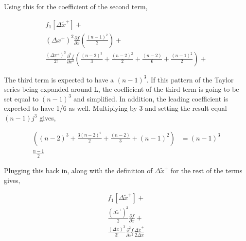 \documentclass[12pt]{article}
\begin{document}
Using this for the coefficient of the second term,

\begin{align*}
     f_1\left[ \Delta \widetilde{x}^+  \right] + \\
    (\Delta x^+)^2 \frac{\partial f}{\partial x } \left(
    \frac{(n-1)^2}{2}  \right) + \\
        \frac{(\Delta x^+)^3}{2!} \frac{\partial^2 f}{\partial x^2 } \left(
        \frac{(n-2)^3}{3} + \frac{(n-2)^2}{2} + \frac{(n-2)}{6} + \frac{(n-1)^2}{2} \right)  +
\end{align*}

The third term is expected to have a $\left( n-1 \right)^3$. If this pattern
of the Taylor series being expanded around L, the coefficient of the third term
is going to be set equal to $\left( n-1 \right)^3$ and simplified. In addition,
the leading coefficient is expected to have 1/6 as well. Multiplying by 3
and setting the result equal $(n-1)j^3$ gives,

\begin{align*}
    \left(
    (n-2)^3 + \frac{3(n-2)^2}{2} + \frac{(n-2)}{3} + (n-1)^2 
    \right)
    &=
    (n-1)^3 \\
    \frac{n-1}{2}
\end{align*}

Plugging this back in, along with the definition of $\Delta \widetilde{x}^+$ for
the rest of the terms gives,

\begin{align*}
     f_1\left[ \Delta \widetilde{x}^+  \right] + \\
 \frac{(\Delta \widetilde{x}^+)^2}{2}     \frac{\partial f}{\partial x }  + \\
 \frac{(\Delta x)^3}{3!} \frac{\partial^2 f}{\partial x^2 } 
 \frac{ \Delta \widetilde{x}^+
 }{2\Delta x}
 \end{align*}
\end{document}
